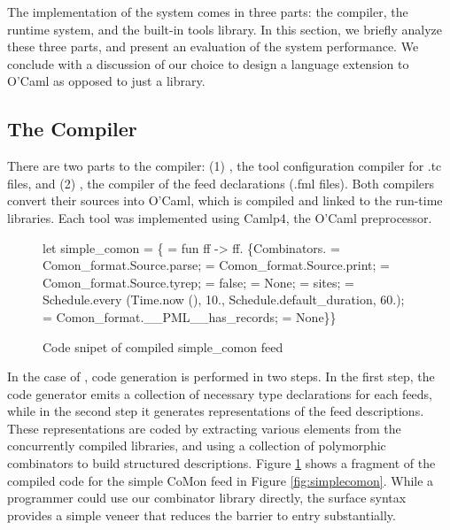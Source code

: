 The implementation of the \padsd{} system comes in
three parts: the compiler, the runtime system, and the
built-in tools library. In this section, we briefly
analyze these three parts, and present 
an evaluation of the system performance.  We conclude
with a discussion of our choice to design a language
extension to O'Caml as opposed to just a library.

\subsection{The Compiler}
There are two parts to the \padsd{} compiler:
(1) , the tool configuration compiler for .tc files, 
and (2) , the
compiler of the feed declarations (.fml files). Both compilers
convert their sources into O'Caml, which is compiled and
linked to the run-time libraries.  Each tool was implemented using 
Camlp4, the O'Caml preprocessor. 

\begin{figure}[th]
\centering
\begin{codebox}
let simple_comon =
\{ = fun ff ->
 ff.
 \{Combinators. = Comon_format.Source.parse;
   = Comon_format.Source.print;
   = Comon_format.Source.tyrep; 
   = false;
   = None; 
   = sites;
   =
    Schedule.{\kw every} (Time.now (), 10., 
                    Schedule.default_duration, 60.);
   = Comon_format.__PML__has_records; 
   = None\}\}
\end{codebox}
\caption{Code snipet of compiled simple\_comon feed}\label{fig:compiledcomon}
\end{figure}

In the case of , code generation is performed in two steps.
In the first step, the code generator emits a collection of
necessary type declarations for each feeds, while in the second step
it generates representations of the feed descriptions.  These representations
are coded by extracting various elements from the concurrently
compiled \padsml{} libraries,
and using a collection of polymorphic combinators to build structured 
descriptions.  Figure \ref{fig:compiledcomon} shows a fragment of
the compiled code for
the simple CoMon feed in Figure \ref{fig:simplecomon}.
While a programmer could use our combinator library directly, the
surface syntax provides a simple veneer that reduces the barrier to
entry substantially.

